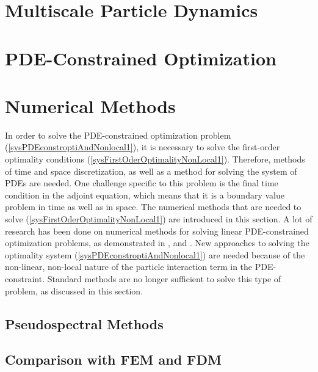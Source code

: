 \documentclass[11pt, a4paper]{article}
\theoremstyle{definition}
\begin{document}
\section{Multiscale Particle Dynamics}

	

\section{PDE-Constrained Optimization} 




\section{Numerical Methods}	

In order to solve the PDE-constrained optimization problem (\ref{sysPDEconstroptiAndNonlocal1}), it is necessary to solve the first-order optimality conditions (\ref{sysFirstOderOptimalityNonLocal1}). Therefore, methods of time and space discretization, as well as a method for solving the system of PDEs are needed. One challenge specific to this problem is the final time condition in the adjoint equation, which means that it is a boundary value problem in time as well as in space. 	
The numerical methods that are needed to solve (\ref{sysFirstOderOptimalityNonLocal1}) are introduced in this section.
A lot of research has been done on numerical methods for solving linear PDE-constrained optimization problems, as demonstrated in \cite{DeLosReyesOptimization}, \cite{CarraroDirectIndirectMultipleShooting} and \cite{TroeltzschFredi2010OCoP}.
New approaches to solving the optimality system (\ref{sysPDEconstroptiAndNonlocal1}) are needed because of the non-linear, non-local nature of the particle interaction term in the PDE-constraint. Standard methods are no longer sufficient to solve this type of problem, as discussed in this section.

\subsection{Pseudospectral Methods} \label{secPSMTheory1}



\subsection{Comparison with FEM and FDM} \label{secCompareFEMFDMPDM}
\end{document}
